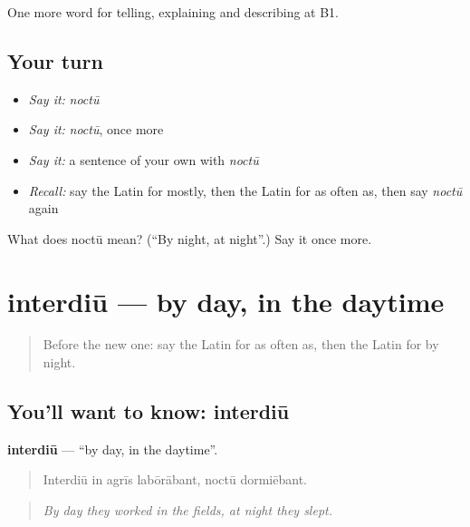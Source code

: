 \begin{grammarlens}[title={What you've built}]
One more word for telling, explaining and describing at B1.
\end{grammarlens}

\subsection*{Your turn}
\begin{itemize}
\raggedright
  \item \emph{Say it:} \emph{noctū}
  \item \emph{Say it:} \emph{noctū}, once more
  \item \emph{Say it:} a sentence of your own with \emph{noctū}
  \item \emph{Recall:} say the Latin for mostly, then the Latin for as often as, then say \emph{noctū} again
\end{itemize}

\begin{tcolorbox}[breakable,colback=teal!4,colframe=teal!35!black,title={Before you move on}]
What does noctū mean? (\textquotedblleft{}By night, at night\textquotedblright{}.) Say it once more.
\end{tcolorbox}
\section[interdiū]{interdiū — by day, in the daytime}

\label{lesson:LA-C295-interdiu}



\begin{quote}
Before the new one: say the Latin for as often as, then the Latin for by night.
\end{quote}

\subsection*{You'll want to know: interdiū}
\textbf{interdiū} — \textquotedblleft{}by day, in the daytime\textquotedblright{}.

\begin{quote}
Interdiū in agrīs labōrābant, noctū dormiēbant.
\end{quote}

\begin{quote}
\emph{By day they worked in the fields, at night they slept.}
\end{quote}

